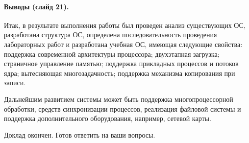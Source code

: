\documentclass[12pt]{article}
\begin{document}
\paragraph{Выводы (слайд 21).}
Итак, в результате выполнения работы был проведен анализ существующих ОС, разработана структура ОС,
определена последовательность проведения лабораторных работ и разработана учебная ОС, имеющая следующие свойства:
поддержка современной архитектуры процессора; двухэтапная загрузка; страничное управление памятью; поддержка
прикладных процессов и потоков ядра; вытесняющая многозадачность; поддержка механизма копирования при записи.

Дальнейшим развитием системы может быть поддержка многопроцессорной обработки, средств синхронизации процессов,
реализация файловой системы и поддержка дополнительного оборудования, например, сетевой карты.

Доклад окончен. Готов ответить на ваши вопросы.
\end{document}
